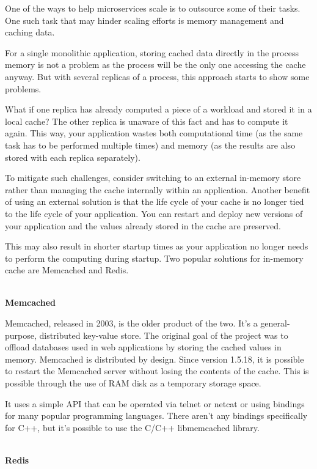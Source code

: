 One of the ways to help microservices scale is to outsource some of their tasks. One such task that may hinder scaling efforts is memory management and caching data.

For a single monolithic application, storing cached data directly in the process memory is not a problem as the process will be the only one accessing the cache anyway. But with several replicas of a process, this approach starts to show some problems.

What if one replica has already computed a piece of a workload and stored it in a local cache? The other replica is unaware of this fact and has to compute it again. This way, your application wastes both computational time (as the same task has to be performed multiple times) and memory (as the results are also stored with each replica separately).

To mitigate such challenges, consider switching to an external in-memory store rather than managing the cache internally within an application. Another benefit of using an external solution is that the life cycle of your cache is no longer tied to the life cycle of your application. You can restart and deploy new versions of your application and the values already stored in the cache are preserved.

This may also result in shorter startup times as your application no longer needs to perform the computing during startup. Two popular solutions for in-memory cache are Memcached and Redis.

\hspace*{\fill} \\ %
\noindent
\textbf{Memcached}

Memcached, released in 2003, is the older product of the two. It's a general-purpose,  distributed key-value store. The original goal of the project was to offload databases used in web applications by storing the cached values in memory. Memcached is distributed by design. Since version 1.5.18, it is possible to restart the Memcached server without losing the contents of the cache. This is possible through the use of RAM disk as a temporary storage space.

It uses a simple API that can be operated via telnet or netcat or using bindings for many popular programming languages. There aren't any bindings specifically for C++, but it's possible to use the C/C++ libmemcached library.

\hspace*{\fill} \\ %
\noindent
\textbf{Redis}

